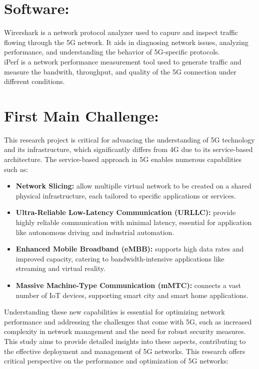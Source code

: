 \documentclass{report}
\begin{document}
\section*{Software:}
Wirershark is a network protocol analyzer used to capure and inspect traffic flowing through the 5G network. It aids in diagnosing network issues, analyzing performance, and understanding the behavior of 5G-specific protocols. 
\\iPerf is a network performance measurement tool used to generate traffic and measure the bandwith, throughput, and quality of the 5G connection under different conditions. \\
\section*{First Main Challenge:}
This research project is critical for advancing the understanding of 5G technology and its infrastructure, which significantly differs from 4G due to its service-based architecture. The service-based approach in 5G enables numerous capabilities such as:
\begin{itemize}
	\item \textbf{Network Slicing:} allow multiplle virtual network to be created on a shared physical infrastructure, each tailored to specific applications or services.
	
	\item \textbf{Ultra-Reliable Low-Latency Communication (URLLC):} provide highly reliable communication with minimal latency, essential for application like autonomous driving and industrial automation.
	
	\item \textbf{Enhanced Mobile Broadband (eMBB):} supports high data rates and improved capacity, catering to bandwidth-intensive applications like streaming and virtual reality. 
	
	\item \textbf{Massive Machine-Type Communication (mMTC):} connects a vast number of IoT devices, supporting smart city and smart home applications. 
\end{itemize}
Understanding these new capabilities is essential for optimizing network performance and addressing the challenges that come with 5G, such as increased complexity in network management and the need for robust security measures. This study aims to provide detailed insights into these aspects, contributing to the effective deployment and management of 5G networks. This research offers critical perspective on the performance and optimization of 5G networks:
\end{document}
